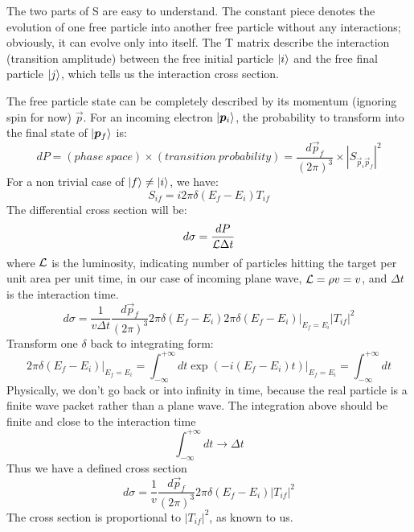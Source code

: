 The two parts of S are easy to understand.
The constant piece denotes the evolution of one free particle into another free
particle without any interactions; obviously, it can evolve only into itself.
The T matrix describe the interaction (transition amplitude) between the free
initial particle $\ket{i}$ and the free final particle $\ket{j}$, which tells
us the interaction cross section.

The free particle state can be completely described by its momentum (ignoring spin
for now) $\vec{p}$. For an incoming electron $\ket{\boldsymbol{p}_i}$, the probability
to transform into the final state of $\ket{\boldsymbol{p}_f}$ is:
\begin{equation}
    dP = (phase\ space) \times (transition\ probability) = \frac{d\vec{p}_f}{(2\pi)^3} \times |S_{\vec{p}_i\vec{p}_f}|^2
\end{equation}
For a non trivial case of $\ket{f} \ne \ket{i}$, we have:
\begin{equation}
    S_{if} = i2\pi \delta(E_f - E_i)T_{if}
\end{equation}
The differential cross section will be:
\begin{equation}
    d\sigma = \frac{dP}{\mathcal{L} \Delta t}
\end{equation}
where $\mathcal{L}$ is the luminosity, indicating number of particles hitting 
the target per unit area per unit time, in our case of incoming plane wave, 
$\mathcal{L} = \rho v = v$, and $\Delta t$ is the interaction time.
\begin{equation}
    d\sigma = \frac{1}{v\Delta t} \frac{d\vec{p}_f}{(2\pi)^3} 2\pi\delta(E_f - E_i) \left. 2\pi\delta(E_f - E_i)\right|_{E_f = E_i} |T_{if}|^2
\end{equation}
Transform one $\delta$ back to integrating form: 
\begin{equation}
    \left. 2\pi\delta(E_f - E_i) \right|_{E_f = E_i} 
    = \int_{-\infty}^{+\infty} dt \left.\exp(-i(E_f - E_i)t)\right|_{E_f = E_i}
    = \int_{-\infty}^{+\infty} dt 
\end{equation}
Physically, we don't go back or into infinity in time, because the real particle
is a finite wave packet rather than a plane wave. The integration above should 
be finite and close to the interaction time
\begin{equation}
    \int_{-\infty}^{+\infty} dt \rightarrow \Delta t
\end{equation}
Thus we have a defined cross section
\begin{equation}
    d\sigma = \frac{1}{v} \frac{d\vec{p}_f}{(2\pi)^3} 2\pi\delta(E_f - E_i) |T_{if}|^2
\end{equation}
The cross section is proportional to $|T_{if}|^2$, as known to us.


